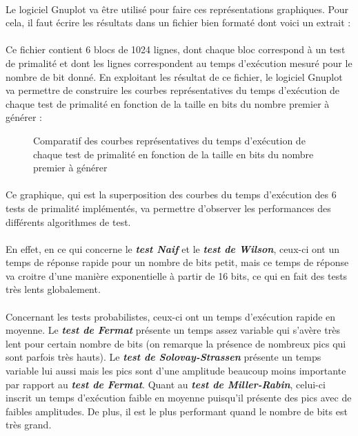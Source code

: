 			\paragraph{} Le logiciel {\ttfamily Gnuplot} va être utilisé pour faire ces représentations graphiques. Pour cela, il faut écrire les résultats dans un fichier bien formaté dont voici un extrait :
			
			\paragraph{}Ce fichier contient 6 blocs de 1024 lignes, dont chaque bloc correspond à un test de primalité et dont les lignes correspondent au temps d'exécution mesuré pour le nombre de bit donné. En exploitant les résultat de ce fichier, le logiciel {\ttfamily Gnuplot} va permettre de construire les courbes représentatives du temps d'exécution de chaque test de primalité en fonction de la taille en bits du nombre premier à générer :
			
			\begin{figure}[H]\vspace{-1em}\caption{Comparatif des courbes représentatives du temps d'exécution de chaque test de primalité en fonction de la taille en bits du nombre premier à générer}\label{fig:M4}\end{figure}
			
			\paragraph{} Ce graphique, qui est la superposition des courbes du temps d'exécution des 6 tests de primalité implémentés, va permettre d'observer les performances des différents algorithmes de test.
			\paragraph{} En effet, en ce qui concerne le \textit{\textbf{test Naif}} et le \textit{\textbf{test de Wilson}}, ceux-ci ont un temps de réponse rapide pour un nombre de bits petit, mais ce temps de réponse va croitre d'une manière exponentielle à partir de 16 bits, ce qui en fait des tests très lents globalement.
			\paragraph{} Concernant les tests probabilistes, ceux-ci ont un temps d'exécution rapide en moyenne. Le \textit{\textbf{test de Fermat}} présente un temps assez variable qui s'avère très lent pour certain nombre de bits (on remarque la présence de nombreux pics qui sont parfois très hauts). Le \textit{\textbf{test de Solovay-Strassen}} présente un temps variable lui aussi mais les pics sont d'une amplitude beaucoup moins importante par rapport au \textit{\textbf{test de Fermat}}. Quant au \textit{\textbf{test de Miller-Rabin}}, celui-ci inscrit un temps d'exécution faible en moyenne puisqu'il présente des pics avec de faibles amplitudes. De plus, il est le plus performant quand le nombre de bits est très grand.
		
